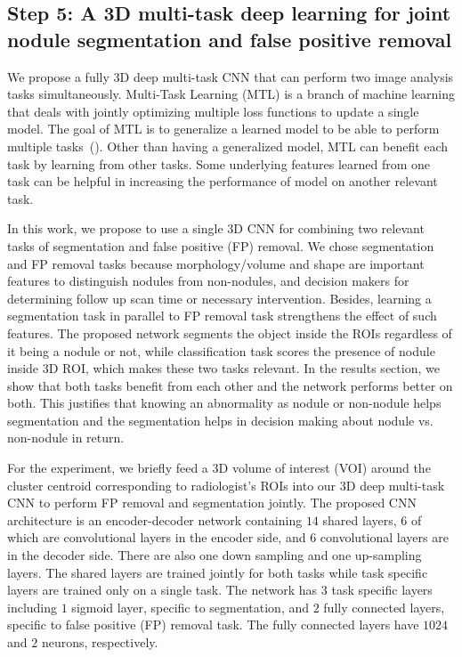 \documentclass[preprint,12pt]{elsarticle}
\begin{document}
\subsection{Step 5: A 3D multi-task deep learning for joint nodule segmentation and false positive removal}
We propose a fully 3D deep multi-task CNN that can perform two image analysis tasks simultaneously. Multi-Task Learning (MTL) is a branch of machine learning that deals with jointly optimizing multiple loss functions to update a single model. The goal of MTL is to generalize a learned model to be able to perform multiple tasks~(\cite{caruana1998multitask}). Other than having a generalized model, MTL can benefit each task by learning from other tasks. Some underlying features learned from one task can be helpful in increasing the performance of model on another relevant task. 

In this work, we propose to use a single 3D CNN for combining two relevant tasks of segmentation and false positive (FP) removal. We chose segmentation and FP removal tasks because morphology/volume and shape are important features to distinguish nodules from non-nodules, and decision makers for determining follow up scan time or necessary intervention. Besides, learning a segmentation task in parallel to FP removal task strengthens the effect of such features. The proposed network segments the object inside the ROIs regardless of it being a nodule or not, while classification task scores the presence of nodule inside 3D ROI, which makes these two tasks relevant. In the results section, we show that both tasks benefit from each other and the network performs better on both. This justifies that knowing an abnormality as nodule or non-nodule helps segmentation and the segmentation helps in decision making about nodule vs. non-nodule in return.

For the experiment, we briefly feed a 3D volume of interest (VOI) around the cluster centroid corresponding to radiologist’s ROIs into our 3D deep multi-task CNN to perform FP removal and segmentation jointly. The proposed CNN architecture is an encoder-decoder network containing $14$ shared layers, $6$ of which are convolutional layers in the encoder side, and $6$ convolutional layers are in the decoder side. There are also one down sampling and one up-sampling layers. The shared layers are trained jointly for both tasks while task specific layers are trained only on a single task. The network has $3$ task specific layers including $1$ sigmoid layer, specific to segmentation, and $2$ fully connected layers, specific to false positive (FP) removal task. The fully connected layers have $1024$ and $2$ neurons, respectively.
\end{document}
